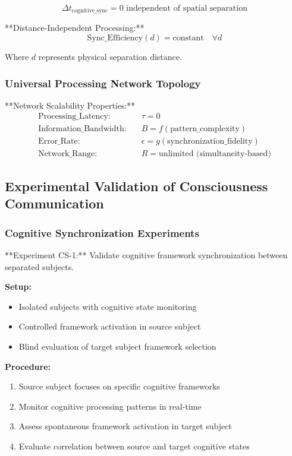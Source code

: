 \documentclass[12pt,a4paper]{article}
\begin{document}
\begin{equation}
\Delta t_{\text{cognitive\_sync}} = 0 \text{ independent of spatial separation}
\label{eq:cognitive_synchronization}
\end{equation}

**Distance-Independent Processing:**
\begin{equation}
\text{Sync\_Efficiency}(d) = \text{constant} \quad \forall d
\label{eq:distance_independent_sync}
\end{equation}

Where $d$ represents physical separation distance.

\subsubsection{Universal Processing Network Topology}

**Network Scalability Properties:**
\begin{align}
\text{Processing\_Latency:} &\quad \tau = 0 \\
\text{Information\_Bandwidth:} &\quad B = f(\text{pattern\_complexity}) \\
\text{Error\_Rate:} &\quad \epsilon = g(\text{synchronization\_fidelity}) \\
\text{Network\_Range:} &\quad R = \text{unlimited (simultaneity-based)}
\end{align}

\subsection{Experimental Validation of Consciousness Communication}

\subsubsection{Cognitive Synchronization Experiments}

**Experiment CS-1:** Validate cognitive framework synchronization between separated subjects.

\textbf{Setup:}
\begin{itemize}
\item Isolated subjects with cognitive state monitoring
\item Controlled framework activation in source subject
\item Blind evaluation of target subject framework selection
\end{itemize}

\textbf{Procedure:}
\begin{enumerate}
\item Source subject focuses on specific cognitive frameworks
\item Monitor cognitive processing patterns in real-time
\item Assess spontaneous framework activation in target subject
\item Evaluate correlation between source and target cognitive states
\end{enumerate}
\end{document}
